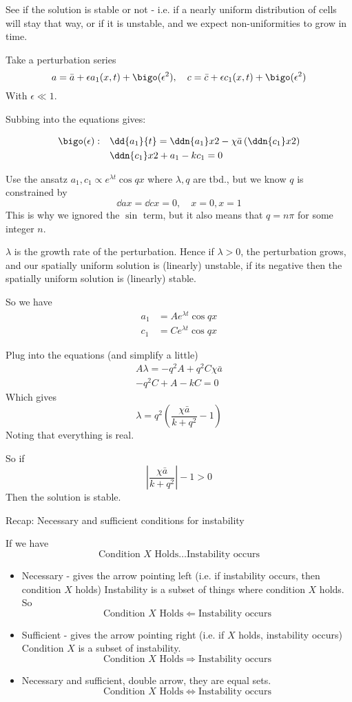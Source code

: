 \documentclass{X:/Documents/Coding/Latex/myassignment}
\begin{document}
See if the solution is stable or not - i.e. if a nearly uniform distribution of cells will stay that way, or if it is unstable, and we expect non-uniformities to grow in time.

Take a perturbation series
\[a = \bar{a} + \epsilon a_1(x,t) + \bigo(\epsilon^2), \quad c = \bar{c} + \epsilon c_1(x,t) + \bigo(\epsilon^2)\]
With $\epsilon \ll 1$.

Subbing into the equations gives:

\begin{align*}
	\bigo(\epsilon) : \quad &\dd{a_1}{t} = \ddn{a_1} x2 - \chi \bar{a}\left(\ddn{c_1}x2\right)\\
	&\ddn{c_1}x2 + a_1 - kc_1 =0
\end{align*}

Use the ansatz $a_1, c_1 \propto e^{\lambda t} \cos qx$ where $\lambda, q$ are tbd., but we know $q$ is constrained by
\[\dd ax = \dd cx = 0, \quad x=0, x=1\]
This is why we ignored the $\sin$ term, but it also means that $q = n\pi$ for some integer $n$.

$\lambda$ is the growth rate of the perturbation. Hence if $\lambda > 0$, the perturbation grows, and our spatially uniform solution is (linearly) unstable, if its negative then the spatially uniform solution is (linearly) stable.   

So we have
\begin{align*}
	a_1 &= Ae^{\lambda t} \cos qx\\
	c_1 &= Ce^{\lambda t} \cos qx
\end{align*}

Plug into the equations (and simplify a little)
\begin{align*}
	A\lambda = - q^2A + q^2 C\chi \bar{a}\\
	-q^2C + A - kC = 0
\end{align*}
Which gives
\[\lambda = q^2 \left(\frac{\chi \bar{a}}{k+q^2} - 1\right)\]
Noting that everything is real.

So if 
\[\left|\frac{\chi \bar{a}}{k + q^2}\right| -1 >0\]
Then the solution is stable.

Recap:
Necessary and sufficient conditions for instability

If we have
\[\text{Condition } X \text{ Holds}  \ldots \text{Instability occurs}\]
\begin{itemize}
	\item Necessary - gives the arrow pointing left (i.e. if instability occurs, then condition $X$ holds) Instability is a subset of things where condition $X$ holds. So
	\[\text{Condition } X \text{ Holds}  \Leftarrow \text{Instability occurs}\]

	\item Sufficient - gives the arrow pointing right (i.e. if $X$ holds, instability occurs)
	Condition $X$ is a subset of instability.
	\[\text{Condition } X \text{ Holds}  \Rightarrow \text{Instability occurs}\]

	\item Necessary and sufficient, double arrow, they are equal sets.
	\[\text{Condition } X \text{ Holds}  \Leftrightarrow \text{Instability occurs}\]

\end{itemize}
\end{document}
